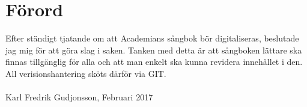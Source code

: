 \thispagestyle{empty}
\chapter*{Förord}
Efter ständigt tjatande om att Academians sångbok bör digitaliseras, beslutade jag mig för att göra slag i saken. Tanken med detta är att sångboken lättare ska finnas tillgänglig för alla och att man enkelt ska kunna revidera innehållet i den. All verisionshantering sköts därför via GIT.\\
\\
Karl Fredrik Gudjonsson, Februari 2017

